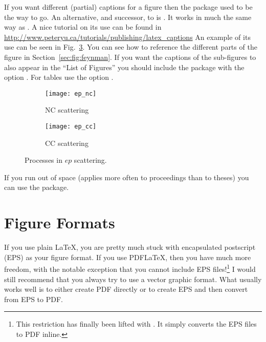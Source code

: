 If you want different (partial) captions for a figure then the
 package used to be the way to go. 
An alternative, and successor, to  is
. It works in much the same way as
. A nice tutorial on its use can be found in
\url{http://www.peteryu.ca/tutorials/publishing/latex_captions}
An example of its
use can be seen in Fig.~\ref{fig:nccc}. You can see how to reference
the different parts of the figure in Section~\ref{sec:fig:feynman}. If
you want the captions of the sub-figures to also appear in the
\enquote{List of Figures} you should include the package with the
option . For tables use the option .


\begin{figure}[htbp]
  \centering
  \begin{subfigure}[b]{0.5\figwidth}
    \texttt{[image: ep\_nc]}
    \caption{NC scattering}\label{fig:nccc-nc}
  \end{subfigure}
  \qquad
  \begin{subfigure}[b]{0.5\figwidth}
    \texttt{[image: ep\_cc]}
    \caption{CC scattering}\label{fig:nccc-cc}
  \end{subfigure}
  \caption{Processes in $ep$ scattering.}
  \label{fig:nccc}
\end{figure}

If you run out of space (applies more often to proceedings than to
theses) you can use the  package.


\section{Figure Formats}
\label{sec:fig:formats}

If you use plain \LaTeX, you are pretty much stuck with encapsulated
postscript (EPS) as your figure format. If you use PDF\LaTeX, then you
have much more freedom, with the notable exception that you cannot
include EPS files!\footnote{%
This restriction has finally been lifted with . It
simply converts the EPS files to PDF inline.}
I would still recommend that you always try to use
a vector graphic format. What usually works well is to either create
PDF directly or to create EPS and then convert from EPS to PDF.

